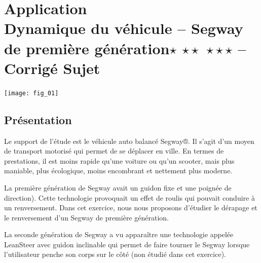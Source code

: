 \chapter*{Application  \\ 
Dynamique du véhicule -- Segway de première génération\ifnormal $\star$ \else \fi \ifdifficile $\star\star$ \else \fi \iftdifficile $\star\star\star$ \else \fi 
-- \ifprof Corrigé \else Sujet \fi}

\iflivret {} \else
\ifprof  {} \else \fi
\fi

\setcounter{question}{0}
\begin{marginfigure}
\texttt{[image: fig\_01]}
\end{marginfigure}

\section*{Présentation}
\ifprof
\else

Le support de l’étude est le véhicule auto balancé Segway®. Il s’agit d’un moyen de transport motorisé qui permet de se déplacer en ville. En termes de prestations, il est moins rapide qu’une voiture ou qu’un scooter, mais plus maniable, plus écologique, moins encombrant et nettement plus moderne.

	La première génération de Segway avait un guidon fixe et une poignée de direction). Cette technologie provoquait un effet de roulis qui pouvait conduire à un renversement. Dans cet exercice, nous nous proposons d’étudier le dérapage et le renversement d’un Segway de première génération.
	
	La seconde génération de Segway a vu apparaître une technologie appelée LeanSteer avec guidon inclinable qui permet de faire tourner le Segway lorsque l'utilisateur penche son corps sur le côté (non étudié dans cet exercice).

